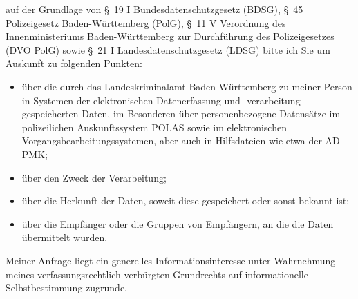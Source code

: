 auf der Grundlage von §~19 I Bundesdatenschutzgesetz (BDSG),
§~45 Polizeigesetz Baden-Württemberg (PolG),
§~11 V Verordnung des Innenministeriums Baden-Württemberg zur Durchführung des
Polizeigesetzes (DVO PolG) sowie §~21 I Landesdatenschutzgesetz (LDSG) bitte ich
Sie um Auskunft zu folgenden Punkten:

\begin{itemize}
  \item über die durch das Landeskriminalamt Baden-Württemberg zu meiner Person
  in Systemen der elektronischen Datenerfassung und -verarbeitung gespeicherten
  Daten, im Besonderen über personenbezogene Datensätze im polizeilichen Auskunftssystem
  POLAS sowie im elektronischen Vorgangsbearbeitungssystemen, aber auch in
  Hilfsdateien wie etwa der AD PMK;

  \item über den Zweck der Verarbeitung;

  \item über die Herkunft der Daten, soweit diese gespeichert oder sonst bekannt ist;

  \item über die Empfänger oder die Gruppen von Empfängern, an die die Daten übermittelt wurden.
\end{itemize}

Meiner Anfrage liegt ein generelles Informationsinteresse unter Wahrnehmung
meines verfassungsrechtlich verbürgten Grundrechts auf informationelle
Selbstbestimmung zugrunde.
